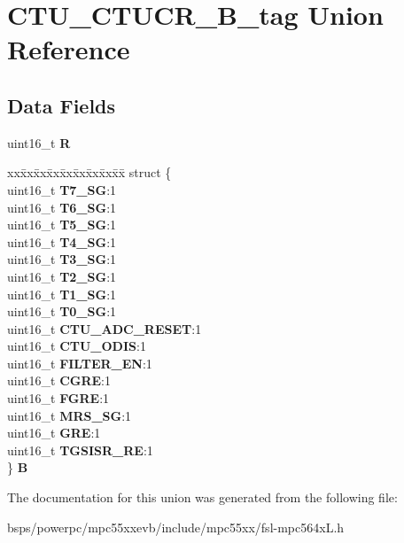 \hypertarget{unionCTU__CTUCR__16B__tag}{}\section{C\+T\+U\+\_\+\+C\+T\+U\+C\+R\+\_\+B\+\_\+tag Union Reference}
\label{unionCTU__CTUCR__16B__tag}
\subsection*{Data Fields}
\begin{DoxyCompactItemize}
\item 
\mbox{\label{unionCTU__CTUCR__16B__tag_aee23c49c4bb150e590e1096aa635bcf7}} 
uint16\+\_\+t {\bfseries R}
\item 
\mbox{\label{unionCTU__CTUCR__16B__tag_ad62a46fab48465479ba17ffae74f1fad}} 
\begin{tabbing}
xx\=xx\=xx\=xx\=xx\=xx\=xx\=xx\=xx\=\kill
struct \{\\
\>uint16\_t {\bfseries T7\_SG}:1\\
\>uint16\_t {\bfseries T6\_SG}:1\\
\>uint16\_t {\bfseries T5\_SG}:1\\
\>uint16\_t {\bfseries T4\_SG}:1\\
\>uint16\_t {\bfseries T3\_SG}:1\\
\>uint16\_t {\bfseries T2\_SG}:1\\
\>uint16\_t {\bfseries T1\_SG}:1\\
\>uint16\_t {\bfseries T0\_SG}:1\\
\>uint16\_t {\bfseries CTU\_ADC\_RESET}:1\\
\>uint16\_t {\bfseries CTU\_ODIS}:1\\
\>uint16\_t {\bfseries FILTER\_EN}:1\\
\>uint16\_t {\bfseries CGRE}:1\\
\>uint16\_t {\bfseries FGRE}:1\\
\>uint16\_t {\bfseries MRS\_SG}:1\\
\>uint16\_t {\bfseries GRE}:1\\
\>uint16\_t {\bfseries TGSISR\_RE}:1\\
\} {\bfseries B}\\

\end{tabbing}\end{DoxyCompactItemize}


The documentation for this union was generated from the following file\+:\begin{DoxyCompactItemize}
\item 
bsps/powerpc/mpc55xxevb/include/mpc55xx/fsl-\/mpc564x\+L.\+h\end{DoxyCompactItemize}
